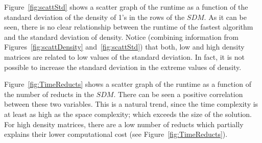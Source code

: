 \documentclass[authoryear,11pt]{elsarticle}
\begin{document}
	Figure~\ref{fig:scattStd} shows a scatter graph of the runtime as a function of 
	the standard deviation of the density of 1's in the rows of the $SDM$. As it can be seen, there is no
	clear relationship between the runtime of the fastest algorithm and the standard deviation of density.
	Notice (combining information from Figures~\ref{fig:scattDensity} and~\ref{fig:scattStd}) that both, 
	low and high density matrices are related to low values of the standard deviation. In fact, it is not 
	possible to increase the standard deviation in the extreme values of density.
	
	Figure~\ref{fig:TimeReducts} shows a scatter graph of the runtime as a function of the 
	number of reducts in the $SDM$. There can be seen a positive correlation between these two variables.
	This is a natural trend, since the time complexity is at least as high as the space 
	complexity; which exceeds the size of the solution. For high density matrices, there are a low number
	of reducts which partially explains their lower computational cost (see Figure~\ref{fig:TimeReducts}). 
	
\end{document}
